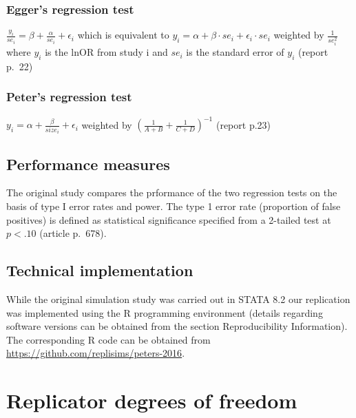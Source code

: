 \documentclass[
  english,
  doc,floatsintext,draftall]{apa6}
\begin{document}
\hypertarget{eggers-regression-test}{%
\subsubsection{Egger's regression test}\label{eggers-regression-test}}

\(\frac{y_i}{se_i}= \beta + \frac{\alpha}{se_i}+\epsilon_i\) which is equivalent to
\(y_i = \alpha +\beta \cdot se_i +\epsilon_i \cdot se_i\) weighted by \(\frac{1}{se_i^2}\)
where \(y_i\) is the lnOR from study i and \(se_i\) is the standard error of \(y_i\)
(report p.~22)

\hypertarget{peters-regression-test}{%
\subsubsection{Peter's regression test}\label{peters-regression-test}}

\(y_i = \alpha +\frac{\beta}{size_i} + \epsilon_i\) weighted by \((\frac{1}{A+B}+\frac{1}{C+D})^{-1}\)
(report p.23)

\hypertarget{performance-measures}{%
\subsection{Performance measures}\label{performance-measures}}

The original study compares the prformance of the two regression tests on the basis of type I error rates and power.
The type 1 error rate (proportion of false positives) is defined as statistical significance specified from a 2-tailed test at \(p<.10\) (article p.~678).

\hypertarget{technical-implementation}{%
\subsection{Technical implementation}\label{technical-implementation}}

While the original simulation study was carried out in STATA 8.2 our replication was implemented
using the R programming environment (details regarding software versions can be obtained from the section Reproducibility Information).
The corresponding R code can be obtained from \url{https://github.com/replisims/peters-2016}.

\hypertarget{replicator-degrees-of-freedom}{%
\section{Replicator degrees of freedom}\label{replicator-degrees-of-freedom}}
\end{document}

